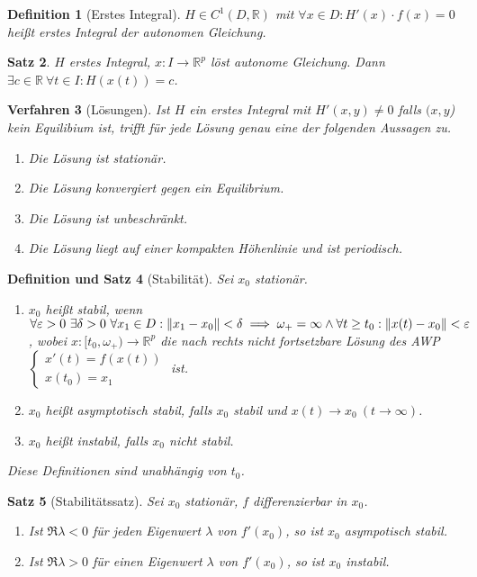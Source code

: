 \documentclass[a4paper]{article}
\newcounter{Sec}
\theoremstyle{marginbreak}
\newtheorem{definition}{Definition}[Sec]
\newtheorem{satz}[definition]{Satz}
\newtheorem{defsatz}[definition]{Definition und Satz}
\newtheorem{verfahren}[definition]{Verfahren}
\newcommand{\R}{\mathbb{R}}
\begin{document}
	\begin{definition}[Erstes Integral]
		$H\in C^1(D,\R)$ mit $\forall x\in D: H'(x)\cdot f(x)=0$ heißt erstes Integral der autonomen Gleichung.
	\end{definition}
	\begin{satz}
		$H$ erstes Integral, $x\colon I\to\R^p$ löst autonome Gleichung. Dann $\exists c\in\R~\forall t\in I: H(x(t)) = c$.
	\end{satz}
	\begin{verfahren}[Lösungen]
		Ist $H$ ein erstes Integral mit $H'(x, y)\neq 0$ falls $(x, y$) kein Equilibium ist, trifft für jede Lösung
		genau eine der folgenden Aussagen zu.
		\begin{enumerate}[label=(\alph*)]
			\item Die Lösung ist stationär.
			\item Die Lösung konvergiert gegen ein Equilibrium.
			\item Die Lösung ist unbeschränkt.
			\item Die Lösung liegt auf einer kompakten Höhenlinie und ist periodisch.
		\end{enumerate}
	\end{verfahren}
	\begin{defsatz}[Stabilität]
		Sei $x_0$ stationär.
		\begin{enumerate}[label=(\alph*)]
			\item $x_0$ heißt stabil, wenn $\forall\varepsilon>0~\exists\delta>0~\forall x_1\in D:
				\norm{x_1-x_0}<\delta\implies \omega_+=\infty\wedge\forall t\geq t_0:\norm{x(t)-x_0}<\varepsilon$,
				wobei $x\colon [t_0,\omega_+)\to\R^p$ die nach rechts nicht fortsetzbare Lösung des AWP
				$\begin{cases}x'(t)=f(x(t))\\x(t_0)=x_1\end{cases}$ ist.
			\item $x_0$ heißt asymptotisch stabil, falls $x_0$ stabil und $x(t)\to x_0~(t\to\infty)$.
			\item $x_0$ heißt instabil, falls $x_0$ nicht stabil.
		\end{enumerate}
		Diese Definitionen sind unabhängig von $t_0$.
	\end{defsatz}
	\begin{satz}[Stabilitätssatz]
		Sei $x_0$ stationär, $f$ differenzierbar in $x_0$.
		\begin{enumerate}[label=(\alph*)]
			\item Ist $\Re\lambda<0$ für \emph{jeden}
				Eigenwert $\lambda$ von $f'(x_0)$, so ist $x_0$ asympotisch stabil.
			\item Ist $\Re\lambda>0$ für \emph{einen} Eigenwert $\lambda$ von $f'(x_0)$, so ist
				$x_0$ instabil.
		\end{enumerate}
	\end{satz}
\end{document}
